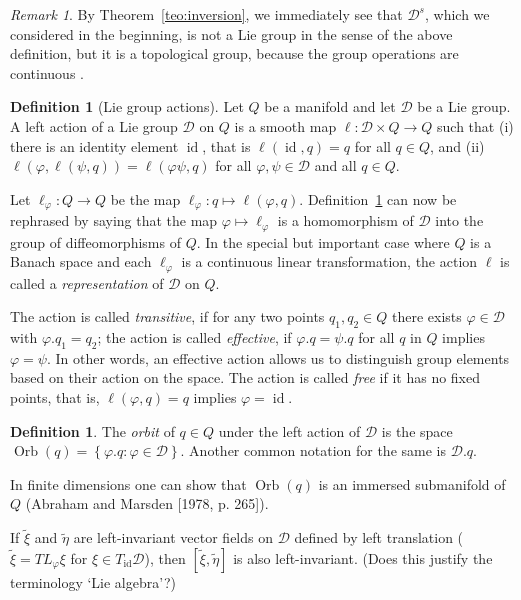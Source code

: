 \documentclass[a5paper,10pt,twoside]{article}
\newcommand{\cD}{\ensuremath{\mathcal{D}}}
\DeclareMathOperator*{\Orb}{Orb}
\DeclareMathOperator*{\id}{id}
\theoremstyle{plain}
\theoremstyle{definition}
\newtheorem{defn}[teo]{Definition}
\theoremstyle{remark}
\newtheorem{rem}[teo]{Remark}
\begin{document}
\begin{rem}
By Theorem~\ref{teo:inversion}, we immediately see that $\cD^s$, which we considered in the beginning, is not a Lie group in the sense of the above definition, but it is a topological group, because the group operations are continuous \cite{ebin1970groups}.
\end{rem}

\begin{defn}[Lie group actions]
	\label{def:liegroupaction}
Let $Q$ be a manifold and let $\cD$ be a Lie group. A left action of a Lie group $\cD$ on $Q$ is a smooth map $\ell:\cD\times Q\to Q$ such that (i) there is an identity element $\id$, that is $\ell(\id,q)=q$ for all $q\in Q$, and (ii) $\ell(\varphi,\ell(\psi,q))=\ell(\varphi\psi,q)$ for all $\varphi,\psi\in\cD$ and all $q\in Q$. 
\end{defn}

Let $\ell_\varphi:Q\to Q$ be the map $\ell_\varphi:q\mapsto \ell(\varphi,q)$. Definition~\ref{def:liegroupaction} can now be rephrased by saying that the map $\varphi\mapsto \ell_\varphi$ is a homomorphism of $\cD$ into the group of diffeomorphisms of $Q$. In the special but important case where $Q$ is a Banach space and each $\ell_\varphi$ is a continuous linear transformation, the action $\ell$ is called a \textit{representation} of $\cD$ on $Q$.

The action is called \emph{transitive}, if for any two points $q_1,q_2 \in Q$ there exists $\varphi \in \cD$ with $\varphi.q_1 = q_2$; the action is called \emph{effective}, if $	\varphi.q = \psi.q$  for all $q$ in $Q$ implies $\varphi = \psi.$ In other words, an effective action allows us to distinguish group elements based on their action on the space. The action is called \textit{free} if it has no fixed points, that is, $\ell(\varphi,q)=q$ implies $\varphi=\id$.

\begin{defn}
The \textit{orbit} of $q\in Q$ under the left action of $\cD$ is the space $\Orb(q)=\left\{\varphi.q: \varphi\in\cD\right\}.$ Another common notation for the same is $\cD.q$.
\end{defn}

In finite dimensions one can show that $\Orb(q)$ is an immersed submanifold of $Q$ (Abraham and Marsden [1978, p. 265]).

If $\tilde{\xi}$ and $\tilde{\eta}$ are left-invariant vector fields on $\cD$ defined by left translation ($\tilde{\xi}=TL_\varphi \xi$ for $\xi\in T_{\id}\cD$), then $[\tilde{\xi},\tilde{\eta}]$ is also left-invariant. (Does this justify the terminology `Lie algebra'?)
\end{document}
